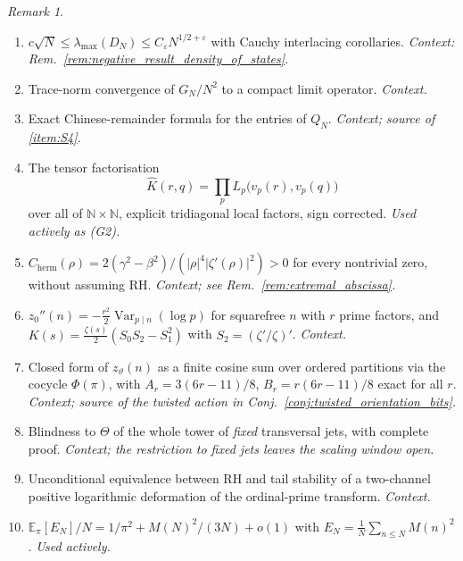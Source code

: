 \documentclass[11pt]{amsart}
\numberwithin{equation}{section}
\theoremstyle{plain}
\theoremstyle{definition}
\theoremstyle{remark}
\newtheorem{remark}[theorem]{Remark}
\DeclareMathOperator{\Var}{Var}
\begin{document}
\begin{remark}
\label{rem:standing_results_list}
\begin{enumerate}[label=(S\arabic*)]
\item \label{item:S1}
$c\sqrt N\le\lambda_{\max}(D_N)\le C_\varepsilon N^{1/2+\varepsilon}$ with
Cauchy interlacing corollaries. \emph{Context:
Rem.~\ref{rem:negative_result_density_of_states}.}
\item \label{item:S2}
Trace-norm convergence of $G_N/N^2$ to a compact limit operator.
\emph{Context.}
\item \label{item:S3}
Exact Chinese-remainder formula for the entries of $Q_N$.
\emph{Context; source of \ref{item:S4}.}
\item \label{item:S4}
The tensor factorisation
\begin{equation}
\widehat K(r,q)=\prod_p L_p\bigl(v_p(r),v_p(q)\bigr)
\label{eq:tensor_factorisation_standing}
\end{equation}
over all of $\mathbb N\times\mathbb N$, explicit tridiagonal local
factors, sign corrected. \emph{Used actively as (G2).}
\item \label{item:S5}
$C_{\mathrm{herm}}(\rho)=2(\gamma^2-\beta^2)/(|\rho|^4|\zeta'(\rho)|^2)>0$
for every nontrivial zero, without assuming RH. \emph{Context; see
Rem.~\ref{rem:extremal_abscissa}.}
\item \label{item:S6}
$z_0''(n)=-\tfrac{r^2}{2}\Var_{p\mid n}(\log p)$ for squarefree $n$ with
$r$ prime factors, and
$K(s)=\tfrac{\zeta(s)}{2}(S_0S_2-S_1^2)$ with $S_2=(\zeta'/\zeta)'$.
\emph{Context.}
\item \label{item:S7}
Closed form of $z_\vartheta(n)$ as a finite cosine sum over ordered
partitions via the cocycle $\Phi(\pi)$, with
$A_r=3(6r-11)/8$, $B_r=r(6r-11)/8$ exact for all $r$. \emph{Context;
source of the twisted action in Conj.~\ref{conj:twisted_orientation_bits}.}
\item \label{item:S8}
Blindness to $\Theta$ of the whole tower of \emph{fixed} transversal
jets, with complete proof. \emph{Context; the restriction to fixed jets
leaves the scaling window open.}
\item \label{item:S9}
Unconditional equivalence between RH and tail stability of a two-channel
positive logarithmic deformation of the ordinal-prime transform.
\emph{Context.}
\item \label{item:S10}
$\mathbb E_\pi[E_N]/N=1/\pi^2+M(N)^2/(3N)+o(1)$ with
$E_N=\tfrac1N\sum_{n\le N}M(n)^2$. \emph{Used actively.}
\end{enumerate}
\end{remark}
\end{document}
